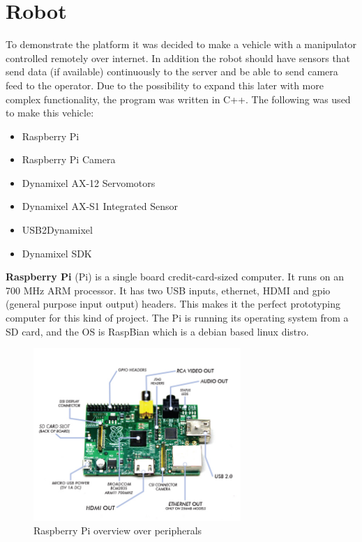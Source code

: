 \section{Robot}
To demonstrate the platform it was decided to make a vehicle with a manipulator controlled remotely over internet. In addition the robot should have sensors that send data (if available) continuously to the server and be able to send camera feed to the operator. Due to the possibility to expand this later with more complex functionality, the program was written in C++.
The following was used to make this vehicle:
\begin{itemize}
    \item Raspberry Pi
    \item Raspberry Pi Camera
    \item Dynamixel AX-12 Servomotors
    \item Dynamixel AX-S1 Integrated Sensor
    \item USB2Dynamixel
    \item Dynamixel SDK
\end{itemize}
\vspace{\secspace}

\textbf{Raspberry Pi} (Pi) is a single board credit-card-sized computer. It runs on an 700 MHz ARM processor.
It has two USB inputs, ethernet, HDMI and gpio (general purpose input output) headers. 
This makes it the perfect prototyping computer for this kind of project. 
The Pi is running its operating system from a SD card, and the OS is RaspBian which is a debian based linux distro.

\begin{figure}[H]
    \centering
    \includegraphics[width=0.7\textwidth]{graphics/Raspberry_Pi.png}	
    \caption{Raspberry Pi overview over peripherals}
    \label{fig:RPi}
\end{figure}

